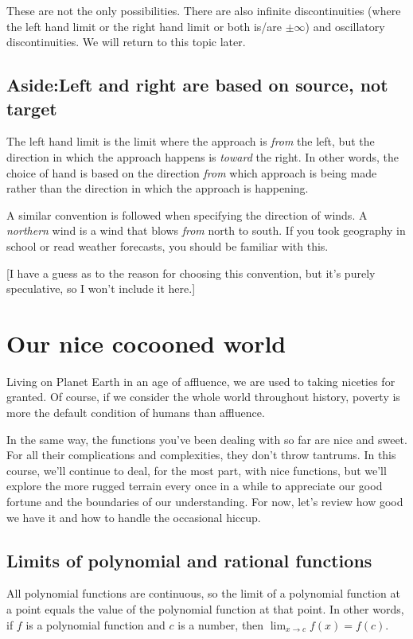 \documentclass[10pt]{amsart}
\begin{document}
These are not the only possibilities. There are also infinite
discontinuities (where the left hand limit or the right hand limit or
both is/are $\pm \infty$) and oscillatory discontinuities. We will
return to this topic later.

\subsection*{Aside:Left and right are based on source, not target}

The left hand limit is the limit where the approach is {\em from} the
left, but the direction in which the approach happens is {\em toward}
the right. In other words, the choice of hand is based on the
direction {\em from} which approach is being made rather than the
direction in which the approach is happening.

A similar convention is followed when specifying the direction of
winds. A {\em northern} wind is a wind that blows {\em from} north to
south. If you took geography in school or read weather forecasts, you
should be familiar with this.

[I have a guess as to the reason for choosing this convention, but
it's purely speculative, so I won't include it here.]


\section{Our nice cocooned world}

Living on Planet Earth in an age of affluence, we are used to taking
niceties for granted. Of course, if we consider the whole world
throughout history, poverty is more the default condition of humans
than affluence.

In the same way, the functions you've been dealing with so far are
nice and sweet. For all their complications and complexities, they
don't throw tantrums. In this course, we'll continue to deal, for the
most part, with nice functions, but we'll explore the more rugged
terrain every once in a while to appreciate our good fortune and the
boundaries of our understanding. For now, let's review how good we
have it and how to handle the occasional hiccup.

\subsection{Limits of polynomial and rational functions}

All polynomial functions are continuous, so the limit of a polynomial
function at a point equals the value of the polynomial function at
that point. In other words, if $f$ is a polynomial function and $c$ is
a number, then $\lim_{x \to c} f(x) = f(c)$.
\end{document}
